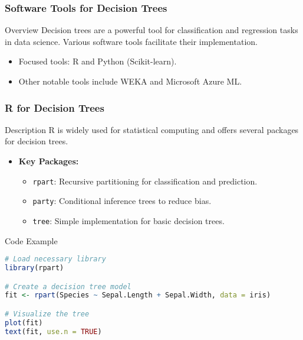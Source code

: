 \documentclass[aspectratio=169]{beamer}
\begin{document}
\begin{frame}
    \frametitle{Software Tools for Decision Trees}
    \begin{block}{Overview}
        Decision trees are a powerful tool for classification and regression tasks in data science. Various software tools facilitate their implementation.
    \end{block}
    \begin{itemize}
        \item Focused tools: R and Python (Scikit-learn).
        \item Other notable tools include WEKA and Microsoft Azure ML.
    \end{itemize}
\end{frame}

\begin{frame}[fragile]
    \frametitle{R for Decision Trees}
    \begin{block}{Description}
        R is widely used for statistical computing and offers several packages for decision trees.
    \end{block}
    \begin{itemize}
        \item \textbf{Key Packages:}
            \begin{itemize}
                \item \texttt{rpart}: Recursive partitioning for classification and prediction.
                \item \texttt{party}: Conditional inference trees to reduce bias.
                \item \texttt{tree}: Simple implementation for basic decision trees.
            \end{itemize}
    \end{itemize}
    \begin{block}{Code Example}
    \begin{lstlisting}[language=R]
# Load necessary library
library(rpart)

# Create a decision tree model
fit <- rpart(Species ~ Sepal.Length + Sepal.Width, data = iris)

# Visualize the tree
plot(fit)
text(fit, use.n = TRUE)
    \end{lstlisting}
    \end{block}
\end{frame}
\end{document}
